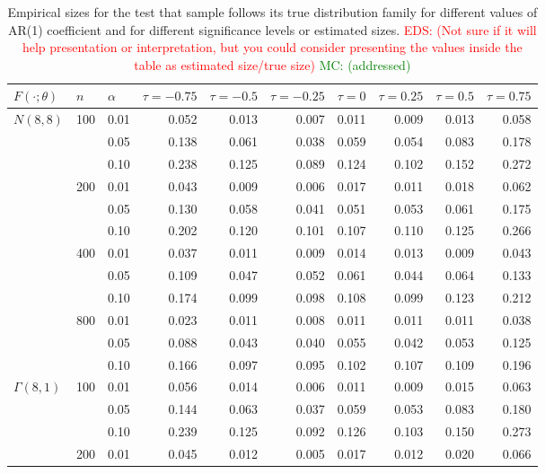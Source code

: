 \documentclass[APA,Times1COL]{WileyNJDv5} %
\newcommand{\eds}[1]{\textcolor{red}{EDS: (#1)}}
\newcommand{\mc}[1]{\textcolor{green}{MC: (#1)}}
\begin{document}
\begin{table}[tbp]
\centering
\caption{Empirical sizes for the test that sample follows its true
                    distribution family for
                   different values of AR(1) coefficient and for different 
                   significance levels or estimated sizes.
		\eds{Not sure if it will help presentation or interpretation, but you could
	consider presenting the values inside the table as estimated size/true size}
	\mc{addressed}}
\label{table:size}
\begin{tabular}{lllrrrrrrr}
  \toprule
$F(\cdot; \theta)$ & $n$ & $\alpha$ & $\tau = -0.75$ & $\tau = -0.5$ & $\tau = -0.25$ 
& $\tau = 0$ & $\tau = 0.25$ & $\tau = 0.5$ & $\tau = 0.75$ \\ 
  \midrule
{$N(8,8)$} & {100} & 0.01 & 0.052 & 0.013& 0.007 & 0.011 & 0.009 & 0.013 & 0.058 \\ 
& & 0.05 & 0.138 & 0.061 & 0.038 & 0.059 & 0.054 & 0.083 & 0.178 \\ 
& & 0.10 & 0.238 & 0.125 & 0.089 & 0.124 & 0.102 & 0.152 & 0.272 \\ 
& {200} & 0.01 & 0.043 & 0.009 & 0.006 & 0.017 & 0.011 & 0.018 & 0.062 \\ 
& & 0.05 & 0.130 & 0.058 & 0.041 & 0.051 & 0.053 & 0.061 & 0.175 \\ 
& & 0.10 & 0.202 & 0.120 & 0.101 & 0.107 & 0.110 & 0.125 & 0.266 \\ 
& {400} & 0.01 & 0.037 & 0.011 & 0.009 & 0.014 & 0.013 & 0.009 & 0.043 \\ 
& & 0.05 & 0.109 & 0.047 & 0.052 & 0.061 & 0.044 & 0.064 & 0.133 \\ 
& & 0.10 & 0.174 & 0.099 & 0.098 & 0.108 & 0.099 & 0.123 & 0.212 \\ 
& {800} & 0.01 & 0.023 & 0.011 & 0.008 & 0.011 & 0.011 & 0.011 & 0.038 \\ 
& & 0.05 & 0.088 & 0.043 & 0.040 & 0.055 & 0.042 & 0.053 & 0.125 \\ 
& & 0.10 & 0.166 & 0.097 & 0.095 & 0.102 & 0.107 & 0.109 & 0.196 \\ [1ex]
{$\Gamma(8,1)$} & {100} & 0.01 & 0.056 & 0.014 & 0.006 & 0.011 & 0.009 & 0.015 & 0.063 \\
  & & 0.05 & 0.144 & 0.063 & 0.037 & 0.059 & 0.053 & 0.083 & 0.180 \\ 
  & & 0.10 & 0.239 & 0.125 & 0.092 & 0.126 & 0.103 & 0.150 & 0.273 \\ 
  & {200} & 0.01 & 0.045 & 0.012 & 0.005 & 0.017 & 0.012 & 0.020 & 0.066 \\ 

\end{tabular}
\end{table}
\end{document}
